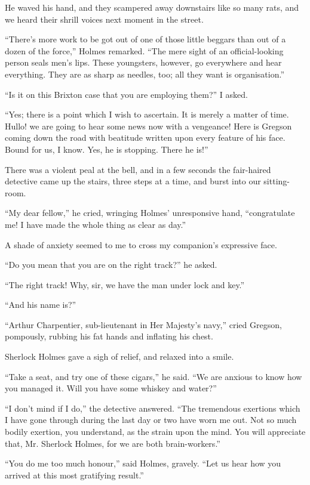 \documentclass[12pt]{book}
\begin{document}
He waved his hand, and they scampered away downstairs like so many rats, and we heard their shrill voices next moment in the street. 

“There’s more work to be got out of one of those little beggars than out of a dozen of the force,” Holmes remarked. “The mere sight of an official-looking person seals men’s lips. These youngsters, however, go everywhere and hear everything. They are as sharp as needles, too; all they want is organisation.” 

“Is it on this Brixton case that you are employing them?” I asked. 

“Yes; there is a point which I wish to ascertain. It is merely a matter of time. Hullo! we are going to hear some news now with a vengeance! Here is Gregson coming down the road with beatitude written upon every feature of his face. Bound for us, I know. Yes, he is stopping. There he is!” 

There was a violent peal at the bell, and in a few seconds the fair-haired detective came up the stairs, three steps at a time, and burst into our sitting-room. 

“My dear fellow,” he cried, wringing Holmes’ unresponsive hand, “congratulate me! I have made the whole thing as clear as day.” 

A shade of anxiety seemed to me to cross my companion’s expressive face. 

“Do you mean that you are on the right track?” he asked. 

“The right track! Why, sir, we have the man under lock and key.” 

“And his name is?” 

“Arthur Charpentier, sub-lieutenant in Her Majesty’s navy,” cried Gregson, pompously, rubbing his fat hands and inflating his chest. 

Sherlock Holmes gave a sigh of relief, and relaxed into a smile. 

“Take a seat, and try one of these cigars,” he said. “We are anxious to know how you managed it. Will you have some whiskey and water?” 

“I don’t mind if I do,” the detective answered. “The tremendous exertions which I have gone through during the last day or two have worn me out. Not so much bodily exertion, you understand, as the strain upon the mind. You will appreciate that, Mr. Sherlock Holmes, for we are both brain-workers.” 

“You do me too much honour,” said Holmes, gravely. “Let us hear how you arrived at this most gratifying result.” 
\end{document}
